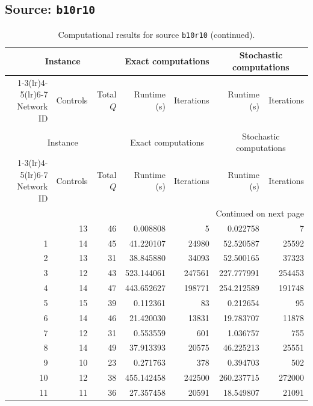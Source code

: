 \documentclass{article}
\begin{document}
\begin{landscape}
\scriptsize
\setlength{\tabcolsep}{4pt}

\subsection*{Source: \texttt{b10r10}}

\begin{longtable}{rrrrrrr}
\caption{Computational results for source \texttt{b10r10}.}\\
\toprule
\multicolumn{3}{c}{Instance} & \multicolumn{2}{c}{Exact computations} & \multicolumn{2}{c}{Stochastic computations} \\
\cmidrule(lr){1-3}\cmidrule(lr){4-5}\cmidrule(lr){6-7}
Network ID & Controls & Total $Q$ & Runtime (s) & Iterations & Runtime (s) & Iterations \\
\midrule
\endfirsthead
\caption[]{Computational results for source \texttt{b10r10} (continued).}\\
\toprule
\multicolumn{3}{c}{Instance} & \multicolumn{2}{c}{Exact computations} & \multicolumn{2}{c}{Stochastic computations} \\
\cmidrule(lr){1-3}\cmidrule(lr){4-5}\cmidrule(lr){6-7}
Network ID & Controls & Total $Q$ & Runtime (s) & Iterations & Runtime (s) & Iterations \\
\midrule
\endhead
\midrule
\multicolumn{7}{r}{Continued on next page} \\
\endfoot
\bottomrule
\endlastfoot
0 & 13 & 46 & 0.008808 & 5 & 0.022758 & 7 \\
1 & 14 & 45 & 41.220107 & 24980 & 52.520587 & 25592 \\
2 & 13 & 31 & 38.845880 & 34093 & 52.500165 & 37323 \\
3 & 12 & 43 & 523.144061 & 247561 & 227.777991 & 254453 \\
4 & 14 & 47 & 443.652627 & 198771 & 254.212589 & 191748 \\
5 & 15 & 39 & 0.112361 & 83 & 0.212654 & 95 \\
6 & 14 & 46 & 21.420030 & 13831 & 19.783707 & 11878 \\
7 & 12 & 31 & 0.553559 & 601 & 1.036757 & 755 \\
8 & 14 & 49 & 37.913393 & 20575 & 46.225213 & 25551 \\
9 & 10 & 23 & 0.271763 & 378 & 0.394703 & 502 \\
10 & 12 & 38 & 455.142458 & 242500 & 260.237715 & 272000 \\
11 & 11 & 36 & 27.357458 & 20591 & 18.549807 & 21091 \\

\end{longtable}
\end{landscape}
\end{document}
